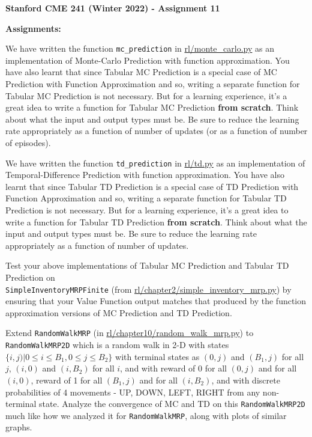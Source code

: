 \documentclass[12pt]{exam}
\begin{document}
\begin{center}
{\large {\bf Stanford CME 241 (Winter 2022) - Assignment 11}}
\end{center}
 
{\large{\bf Assignments:}}
\begin{questions}
\question We have written the function \lstinline{mc_prediction} in \href{https://github.com/TikhonJelvis/RL-book/blob/master/rl/monte_carlo.py}{rl\//monte\_carlo.py} as an implementation of Monte-Carlo Prediction with function approximation. You have also learnt that since Tabular MC Prediction is a special case of MC Prediction with Function Approximation and so, writing a separate function for Tabular MC Prediction is not necessary. But for a learning experience, it's a great idea to write a function for Tabular MC Prediction {\bf from scratch}. Think about what the input and output types must be. Be sure to reduce the learning rate appropriately as a function of number of updates (or as a function of number of episodes). 

\question We have written the function \lstinline{td_prediction} in \href{https://github.com/TikhonJelvis/RL-book/blob/master/rl/td.py}{rl\//td.py} as an implementation of Temporal-Difference Prediction with function approximation. You have also learnt that since Tabular TD Prediction is a special case of TD Prediction with Function Approximation and so, writing a separate function for Tabular TD Prediction is not necessary. But for a learning experience, it's a great idea to write a function for Tabular TD Prediction {\bf from scratch}. Think about what the input and output types must be. Be sure to reduce the learning rate appropriately as a function of number of updates. 

\question Test your above implementations of Tabular MC Prediction and Tabular TD Prediction on \\\lstinline{SimpleInventoryMRPFinite} (from \href{https://github.com/TikhonJelvis/RL-book/blob/master/rl/chapter2/simple_inventory_mrp.py}{rl\//chapter2\//simple\_inventory\_mrp.py}) by ensuring that your Value Function output matches that produced by the function approximation versions of MC Prediction and TD Prediction.

 Extend \lstinline{RandomWalkMRP} (in \href{https://github.com/TikhonJelvis/RL-book/blob/master/rl/chapter10/random_walk_mrp.py}{rl\//chapter10\//random\_walk\_mrp.py}) to \lstinline{RandomWalkMRP2D} which is a random walk in 2-D with states $\{i, j) | 0 \leq i \leq B_1, 0 \leq j \leq B_2\}$ with terminal states as $(0, j)$ and $(B_1, j)$ for all $j$, $(i, 0)$ and $(i, B_2)$ for all $i$, and with reward of 0 for all $(0, j)$ and for all $(i, 0)$, reward of 1 for all $(B_1, j)$ and for all $(i, B_2)$, and with discrete probabilities of 4 movements - UP, DOWN, LEFT, RIGHT from any non-terminal state. Analyze the convergence of MC and TD on this \lstinline{RandomWalkMRP2D} much like how we analyzed it for \lstinline{RandomWalkMRP}, along with plots of similar graphs.

\end{questions}
\end{document}
